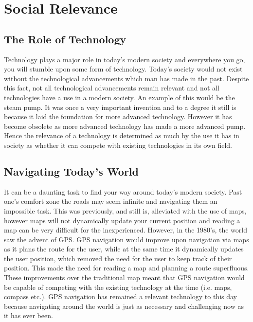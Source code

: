 \section{Social Relevance}

\subsection{The Role of Technology}
Technology plays a major role in today's modern society and everywhere you go, you will stumble upon some form of technology. Today's society would not exist without the technological advancements which man has made in the past. Despite this fact, not all technological advancements remain relevant and not all technologies have a use in a modern society. An example of this would be the steam pump. It was once a very important invention and to a degree it still is because it laid the foundation for more advanced technology. However it has become obsolete as more advanced technology has made a more advanced pump. Hence the relevance of a technology is determined as much by the use it has in society as whether it can compete with existing technologies in its own field.

\subsection{Navigating Today's World}
It can be a daunting task to find your way around today's modern society. Past one's comfort zone the roads may seem infinite and navigating them an impossible task. This was previously, and still is, alleviated with the use of maps, however maps will not dynamically update your current position and reading a map can be very difficult for the inexperienced. However, in the 1980's, the world saw the advent of GPS\cite{gps_advent}. GPS navigation would improve upon navigation via maps as it plans the route for the user, while at the same time it dynamically updates the user position, which removed the need for the user to keep track of their position. This made the need for reading a map and planning a route superfluous.\\
These improvements over the traditional map meant that GPS navigation would be capable of competing with the existing technology at the time (i.e. maps, compass etc.). GPS navigation has remained a relevant technology to this day because navigating around the world is just as necessary and challenging now as it has ever been.

